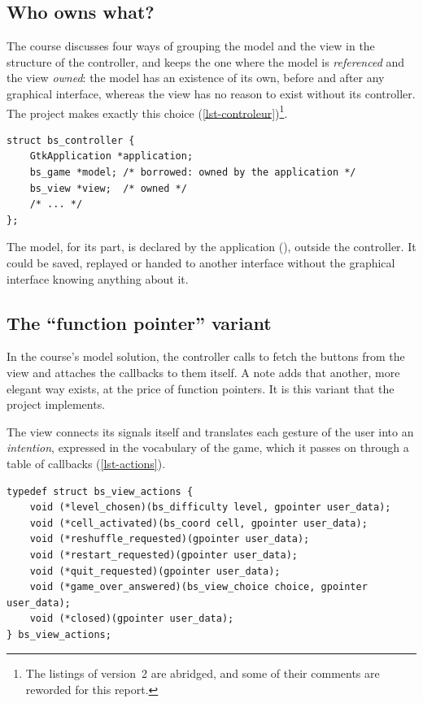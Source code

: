 \subsection{Who owns what?}

The course discusses four ways of grouping the model and the view in the structure of the
controller, and keeps the one where the model is \emph{referenced} and the view \emph{owned}:
the model has an existence of its own, before and after any graphical interface, whereas the
view has no reason to exist without its controller. The project makes exactly this choice
(\cref{lst-controleur})\footnote{The listings of version~2 are abridged, and some of their
    comments are reworded for this report.}.

\begin{lstlisting}[caption={The structure of the controller (\fichier{src/ui/controller.c}).},
                   label={lst-controleur}]
struct bs_controller {
    GtkApplication *application;
    bs_game *model; /* borrowed: owned by the application */
    bs_view *view;  /* owned */
    /* ... */
};
\end{lstlisting}

The model, for its part, is declared by the application (), outside the
controller. It could be saved, replayed or handed to another interface without the graphical
interface knowing anything about it.

\subsection{The \enquote{function pointer} variant}
\label{sec-pointeurs}

In the course's model solution, the controller calls  to
fetch the buttons from the view and attaches the callbacks to them itself. A note adds that
another, more elegant way exists, at the price of function pointers. It is this variant that
the project implements.

The view connects its signals itself and translates each gesture of the user into an
\emph{intention}, expressed in the vocabulary of the game, which it passes on through a table
of callbacks (\cref{lst-actions}).

\begin{lstlisting}[caption={The intentions reported by the view (\fichier{src/ui/view.h}).},
                   label={lst-actions}]
typedef struct bs_view_actions {
    void (*level_chosen)(bs_difficulty level, gpointer user_data);
    void (*cell_activated)(bs_coord cell, gpointer user_data);
    void (*reshuffle_requested)(gpointer user_data);
    void (*restart_requested)(gpointer user_data);
    void (*quit_requested)(gpointer user_data);
    void (*game_over_answered)(bs_view_choice choice, gpointer user_data);
    void (*closed)(gpointer user_data);
} bs_view_actions;
\end{lstlisting}

